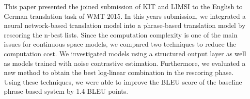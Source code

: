This paper presented the joined submission of KIT and LIMSI to the English to German translation task of WMT 2015. In this years submission, we integrated a neural network-based translation model into a phrase-based translation model by rescoring the n-best lists. Since the computation complexity is one of the main issues for continuous space models, we compared two techniques to reduce the computation cost. We investigated models using a structured output layer as well as models trained with noise contrastive estimation. Furthermore, we evaluated a new method to obtain the best log-linear combination in the rescoring phase. Using these techniques, we were able to improve the BLEU score of the baseline phrase-based system by 1.4 BLEU points.
